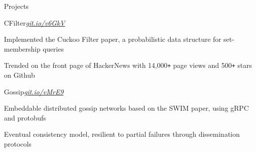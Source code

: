 \documentclass{resume} %
\begin{document}

\begin{rSection}{Projects}
  \begin{rSubsection}{CFilter}{\em{\href{https://git.io/v6GkV}{git.io/v6GkV}}}{}

    \item Implemented the Cuckoo Filter paper, a probabilistic data structure for
      set-membership queries
    \item Trended on the front page of HackerNews with 14,000\texttt{+} page
      views and 500\texttt{+} stars on Github
  \end{rSubsection}

  \begin{rSubsection}{Gossip}{\em{\href{https://git.io/vMrE9}{git.io/vMrE9}}}{}

    \item Embeddable distributed gossip networks based on the SWIM paper, using
      gRPC and protobufs
    \item Eventual consistency model, resilient to partial failures through
      dissemination protocols
  \end{rSubsection}







\end{rSection}
\end{document}
